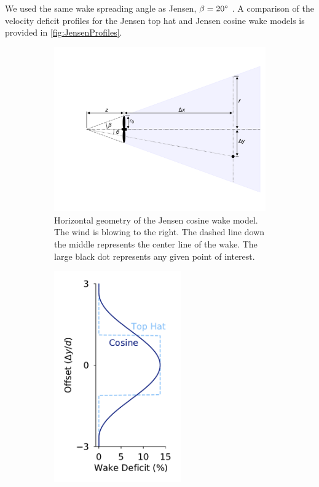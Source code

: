 \documentclass{jpconf}
\begin{document}
We used the same wake spreading angle as Jensen, $\beta = 20 \degree$  \cite{jensen1983}. A comparison of the velocity deficit profiles for the Jensen top hat and Jensen cosine wake models is provided in \cref{fig:JensenProfiles}.
%
\begin{figure}[h!]
	\centering
	\begin{subfigure}[t]{0.6\textwidth}
		\centering
		\includegraphics[width=\textwidth, trim={3cm 0cm 0cm 0cm}, clip]{wake_model_visualizations/jensen_diagram}
		\caption{Horizontal geometry of the Jensen cosine wake model. The wind is blowing to the right. The dashed line down the middle represents the center line of the wake. The large black dot represents any given point of interest.}
		\label{fig:JensenDiagrams}
	\end{subfigure}\hspace{1pc}
	\begin{subfigure}[t]{0.35\textwidth}
		\centering
		\includegraphics[width=0.6\textwidth, trim={1.05cm 0cm 1.05cm 0cm}]{wake_model_visualizations/jensen_profiles}

\end{subfigure}
\end{figure}
\end{document}
